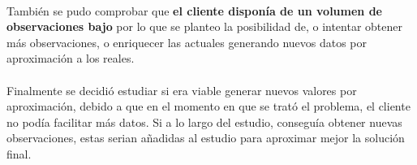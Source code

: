 \paragraph{}
También se pudo comprobar que \textbf{el cliente disponía de un volumen de observaciones bajo} por lo que se planteo la posibilidad de, o intentar obtener más observaciones, o enriquecer las actuales generando nuevos datos por aproximación a los reales.

\paragraph{}
Finalmente se decidió estudiar si era viable generar nuevos valores por aproximación, debido a que en el momento en que se trató el problema, el cliente no podía facilitar más datos. Si a lo largo del estudio, conseguía obtener nuevas observaciones, estas serian añadidas al estudio para aproximar mejor la solución final.






